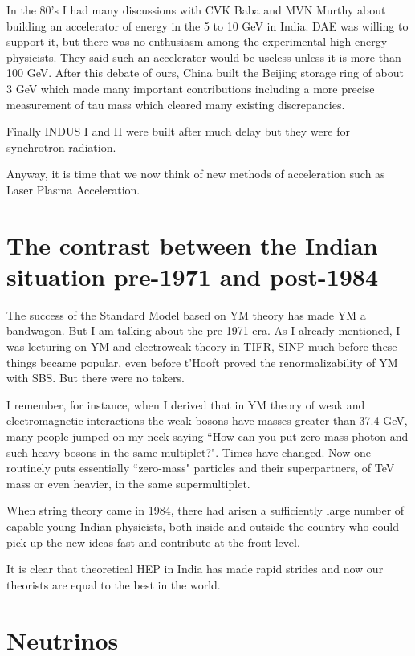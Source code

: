 In the 80's I had many discussions with CVK Baba and MVN Murthy about 
building an accelerator of energy in the 5 to 10 GeV in India. DAE was 
willing to support it, but there was no enthusiasm among the 
experimental high energy physicists. They said such an accelerator would 
be useless unless it is more than 100 GeV. After this debate of ours, 
China built the Beijing sto\-rage ring of about 3 GeV which made many 
important contributions including a more precise measurement of tau mass 
which cleared many existing discrepancies.

Finally INDUS I and II were built after much delay but they were for 
synchrotron radiation.

Anyway, it is time that we now think of new methods of acce\-leration such 
as Laser Plasma Acceleration.

\vspace{-\topsep}
\section*{The contrast between the Indian situation pre-1971 and post-1984}

The success of the Standard Model based on YM theory has made YM a 
bandwagon. But I am talking about the pre-1971 era. As I already 
mentioned, I was lecturing on YM and electroweak theory in TIFR, SINP 
much before these things became popular, even before t'Hooft proved the 
renormalizability of YM with SBS. But there were no takers.

I remember, for instance, when I derived that in YM theory of weak and 
electromagnetic interactions the weak bosons have masses greater than 
37.4 GeV, many people jumped on my neck saying ``How can you put 
zero-mass photon and such heavy bosons in the same multiplet?". Times 
have changed. Now one routinely puts essentially ``zero-mass" particles 
and their superpartners, of TeV mass or even heavier, in the same 
supermultiplet.

When string theory came in 1984, there had arisen a suffici\-ently large 
number of capable young Indian physicists, both inside and outside the 
country who could pick up the new ideas fast and contribute at the front 
level.

It is clear that theoretical HEP in India has made rapid strides and now 
our theorists are equal to the best in the world.

\vspace{-\topsep}
\section*{Neutrinos}

